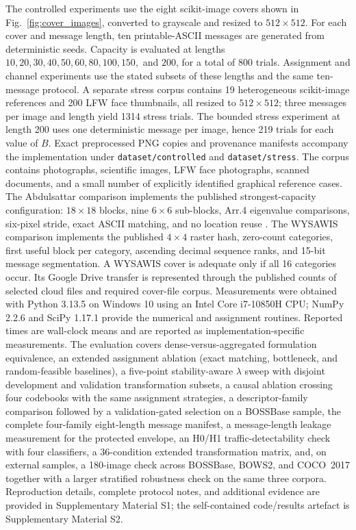 \documentclass[preprint,12pt]{elsarticle}
\theoremstyle{plain}
\begin{document}
The controlled experiments use the eight scikit-image covers shown in
Fig.~\ref{fig:cover_images}, converted to grayscale and resized to
$512\times512$. For each cover and message length, ten printable-ASCII messages
are generated from deterministic seeds. Capacity is evaluated at lengths
$10,20,30,40,50,60,80,100,150,$ and $200$, for a total of 800 trials.
Assignment and channel experiments use the stated subsets of these lengths and
the same ten-message protocol. A separate stress corpus contains 19
heterogeneous scikit-image references and 200 LFW face thumbnails, all resized
to $512\times512$; three messages per image and length yield 1314 stress trials.
The bounded stress experiment at length 200 uses one deterministic message per
image, hence 219 trials for each value of $B$.
Exact preprocessed PNG copies and provenance manifests accompany the
implementation under \texttt{dataset/controlled} and \texttt{dataset/stress}.
The corpus contains photographs,
scientific images, LFW face photographs, scanned documents, and a small number
of explicitly identified graphical reference cases.
The Abdulsattar comparison implements the published strongest-capacity
configuration: $18\times18$ blocks, nine $6\times6$ sub-blocks, Arr.4
eigenvalue comparisons, six-pixel stride, exact ASCII matching, and no
location reuse \cite{abdulsattar2021}. The WYSAWIS comparison implements the
published $4\times4$ raster hash, zero-count categories, first useful block per
category, ascending decimal sequence ranks, and 15-bit message segmentation.
A WYSAWIS cover is adequate only if all 16 categories occur. Its Google Drive
transfer is represented through the published counts of selected cloud files
and required cover-file corpus.
Measurements were obtained with Python 3.13.5
on Windows 10 using an Intel Core i7-10850H CPU; NumPy 2.2.6 and SciPy 1.17.1
provide the numerical and assignment routines. Reported times are wall-clock
means and are reported as implementation-specific measurements.
The evaluation covers dense-versus-aggregated formulation equivalence, an
extended assignment ablation (exact matching, bottleneck, and
random-feasible baselines), a five-point stability-aware $\lambda$ sweep with
disjoint development and validation transformation subsets, a causal ablation
crossing four codebooks with the same assignment strategies, a
descriptor-family comparison followed by a validation-gated selection on a
BOSSBase sample, the complete four-family eight-length message manifest, a
message-length leakage measurement for the protected envelope, an
H0/H1 traffic-detectability check with four classifiers, a 36-condition
extended transformation matrix, and, on external samples, a 180-image check
across BOSSBase, BOWS2, and COCO~2017 together with a larger stratified
robustness check on the same three corpora. Reproduction details, complete protocol notes, and additional evidence are provided in Supplementary Material S1; the self-contained code/results artefact is Supplementary Material S2.
\end{document}
